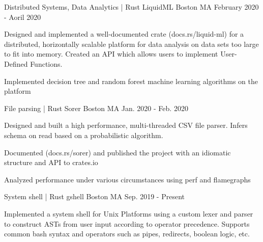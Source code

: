 

\begin{cventries}
    \cventry
    {Distributed Systems, Data Analytics | Rust} %
    {LiquidML} %
    {Boston MA} %
    {February 2020 - Aoril 2020} %
    {
      \begin{cvitems} %
        \item {Designed and implemented a well-documented crate (docs.rs/liquid-ml) for a distributed, horizontally scalable platform for data analysis on data sets too large to fit into memory. Created an API which allows users to implement User-Defined Functions.}
        \item {Implemented decision tree and random forest machine learning algorithms on the platform}
      \end{cvitems}
    }

    \cventry
    {File parsing | Rust} %
    {Sorer} %
    {Boston MA} %
    {Jan. 2020 - Feb. 2020} %
    {
      \begin{cvitems} %
        \item {Designed and built a high performance, multi-threaded CSV file parser. Infers schema on read based on a probabilistic algorithm.}
        \item {Documented (docs.rs/sorer) and published the project with an idiomatic structure and API to crates.io}
        \item {Analyzed performance under various circumstances using perf and flamegraphs}
      \end{cvitems}
    }

    \cventry
    {System shell | Rust} %
    {gshell} %
    {Boston MA} %
    {Sep. 2019 - Present} %
    {
      \begin{cvitems} %
        \item {Implemented a system shell for Unix Platforms using a custom lexer and parser to construct ASTs from user input according to operator precedence. Supports common bash syntax and operators such as pipes, redirects, boolean logic, etc.}
      \end{cvitems}
    }


\end{cventries}
